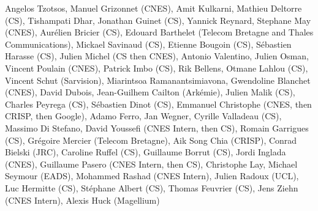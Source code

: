Angelos Tzotsos, Manuel Grizonnet (CNES), Amit Kulkarni, Mathieu Deltorre (CS), Tishampati Dhar, Jonathan Guinet (CS), Yannick Reynard, Stephane May (CNES), Aur\'elien Bricier (CS), Edouard Barthelet (Telecom Bretagne and Thales Communications), Mickael Savinaud (CS), Etienne Bougoin (CS), S\'ebastien Harasse (CS), Julien Michel (CS then CNES), Antonio Valentino, Julien Osman, Vincent Poulain (CNES), Patrick Imbo (CS), Rik Bellens, Otmane Lahlou (CS), Vincent Schut (Sarvision), Miarintsoa Ramanantsimiavona, Gwendoline Blanchet (CNES), David Dubois, Jean-Guilhem Cailton (Ark\'emie), Julien Malik (CS), Charles Peyrega (CS), S\'ebastien Dinot (CS), Emmanuel Christophe (CNES, then CRISP, then Google), Adamo Ferro, Jan Wegner, Cyrille Valladeau (CS), Massimo Di Stefano, David Youssefi  (CNES Intern, then CS), Romain Garrigues (CS), Gr\'egoire Mercier (Telecom Bretagne), Aik Song Chia (CRISP), Conrad Bielski (JRC), Caroline Ruffel (CS), Guillaume Borrut (CS), Jordi Inglada (CNES), Guillaume Pasero (CNES Intern, then CS), Christophe Lay, Michael Seymour (EADS), Mohammed Rashad (CNES Intern), Julien Radoux (UCL), Luc Hermitte (CS), St\'ephane Albert (CS), Thomas Feuvrier (CS), Jens Ziehn (CNES Intern), Alexis Huck (Magellium)